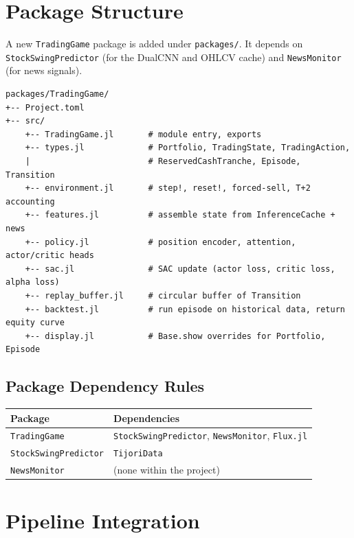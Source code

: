 \documentclass[11pt, a4paper]{article}
\begin{document}
\section{Package Structure}

A new \texttt{TradingGame} package is added under \texttt{packages/}. It
depends on \texttt{StockSwingPredictor} (for the DualCNN and OHLCV cache) and
\texttt{NewsMonitor} (for news signals).

\begin{lstlisting}
packages/TradingGame/
+-- Project.toml
+-- src/
    +-- TradingGame.jl       # module entry, exports
    +-- types.jl             # Portfolio, TradingState, TradingAction,
    |                        # ReservedCashTranche, Episode, Transition
    +-- environment.jl       # step!, reset!, forced-sell, T+2 accounting
    +-- features.jl          # assemble state from InferenceCache + news
    +-- policy.jl            # position encoder, attention, actor/critic heads
    +-- sac.jl               # SAC update (actor loss, critic loss, alpha loss)
    +-- replay_buffer.jl     # circular buffer of Transition
    +-- backtest.jl          # run episode on historical data, return equity curve
    +-- display.jl           # Base.show overrides for Portfolio, Episode
\end{lstlisting}

\subsection{Package Dependency Rules}

\begin{center}
\begin{tabular}{ll}
    \toprule
    Package & Dependencies \\
    \midrule
    \texttt{TradingGame} & \texttt{StockSwingPredictor}, \texttt{NewsMonitor},
                           \texttt{Flux.jl} \\
    \texttt{StockSwingPredictor} & \texttt{TijoriData} \\
    \texttt{NewsMonitor} & (none within the project) \\
    \bottomrule
\end{tabular}
\end{center}

\section{Pipeline Integration}
\end{document}
